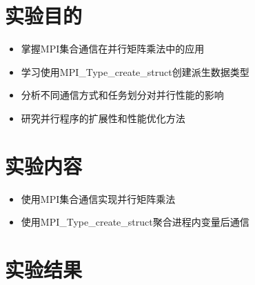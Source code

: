 \documentclass{SYSUReport}
\date{2025年4月2日}
\begin{document}
\cover
\thispagestyle{empty} 
\clearpage

\section{实验目的}
\begin{itemize}
    \item 掌握MPI集合通信在并行矩阵乘法中的应用
    \item 学习使用MPI\_Type\_create\_struct创建派生数据类型
    \item 分析不同通信方式和任务划分对并行性能的影响
    \item 研究并行程序的扩展性和性能优化方法
\end{itemize}

\section{实验内容}
\begin{itemize}
    \item 使用MPI集合通信实现并行矩阵乘法
    \item 使用MPI\_Type\_create\_struct聚合进程内变量后通信
\end{itemize}


\section{实验结果}
\end{document}
